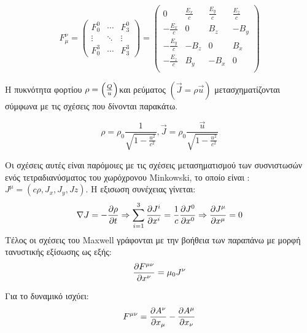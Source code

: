 \begin{equation}
  F_\mu ^\nu=
  \begin{pmatrix}
    F^0 _0  & \cdots & F^0 _3 \\
    \vdots & \ddots & \vdots \\
    F^3 _0  & \cdots & F^3 _3
  \end{pmatrix}
  =
  \begin{pmatrix}
    0                &\frac{E_x}{c} &\frac{E_y}{c} & \frac{E_z}{c} \\
    -\frac{E_x}{c}   & 0            & B_z          & -B_y \\
    -\frac{E_y}{c}   & -B_z         & 0            & B_x \\
    -\frac{E_z}{c}   & B_y          & -B_x         & 0 \\
  \end{pmatrix} 
\end{equation}

Η πυκνότητα φορτίου $\rho = \left(  \frac{Q}{u} \right) $και ρεύματος $(\vec{J}=\rho \vec{u}) $ μετασχηματίζονται σύμφωνα με τις σχέσεις που δίνονται παρακάτω. 

\begin{equation}
  \rho=\rho_0\frac{1}{\sqrt{1-\frac{u^2}{c^2}}} , \vec{J}=\rho_0\frac{\vec{u}}{\sqrt{1-\frac{u^2}{c^2}}}
\end{equation}

Οι σχέσεις αυτές είναι παρόμοιες με τις σχέσεις μετασηματισμού των συσνιστωσών ενός τετραδιανύσματος του χωρόχρονου Minkowski, το οποίο είναι : $J^{\mu}=(c\rho,J_x,J_y,Jz)$. 
Η εξισωση συνέχειας γίνεται: 
\begin{equation}
  \nabla J = -\frac{\partial \rho}{\partial t} \Rightarrow \sum\limits_{i=1}^3 \frac{\partial J^i}{\partial x^i}=\frac{1}{c}\frac{\partial J^0}{\partial x^0} \Rightarrow \frac{\partial J^{\mu}}{\partial x^{\mu}}=0
\end{equation}
Τέλος οι σχέσεις του \textlatin{Maxwell} γράφονται με την βοήθεια των παραπάνω με μορφή τανυστικής εξίσωσης ως εξής: 
\begin{equation}
  \frac{\partial F^{\mu \nu}}{\partial x^{\nu}}=\mu_0 J^{\nu}
\end{equation} 

Για το δυναμικό ισχύει: 
\begin{equation}
  F^{\mu \nu}=\frac{\partial A^\nu}{\partial x_{\mu}}-\frac{\partial A^\mu}{\partial x_{\nu}}
\end{equation} 

  
